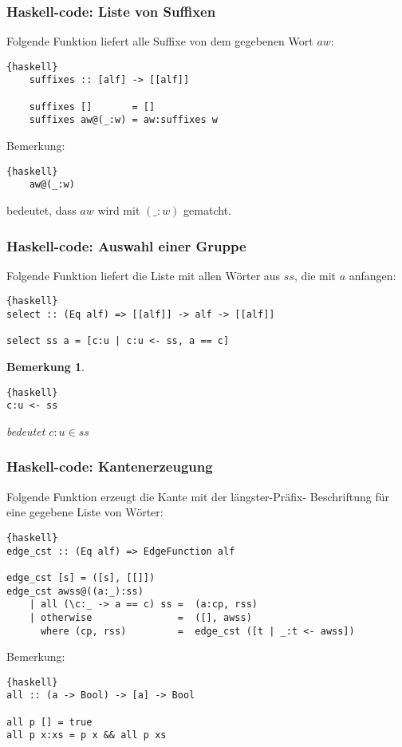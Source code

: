 \documentclass{beamer}
\newtheorem{remark}[theorem]{Bemerkung}
\begin{document}
\begin{frame}[fragile]
\frametitle{Haskell-code: Liste von Suffixen}
    Folgende Funktion liefert alle Suffixe von dem gegebenen Wort $aw$:
    \begin{lstlisting}{haskell}
    suffixes :: [alf] -> [[alf]]

    suffixes []       = []              
    suffixes aw@(_:w) = aw:suffixes w 
    \end{lstlisting}
    \bigskip
    Bemerkung: \begin{lstlisting}{haskell}
    aw@(_:w)
    \end{lstlisting} bedeutet, dass $aw$ wird mit $(\_:w)$ gematcht.
\end{frame}

\begin{frame}[fragile]
\frametitle{Haskell-code: Auswahl einer Gruppe}
    Folgende Funktion liefert die Liste mit allen Wörter aus $ss$, die mit $a$ anfangen:
\begin{lstlisting}{haskell}
select :: (Eq alf) => [[alf]] -> alf -> [[alf]]

select ss a = [c:u | c:u <- ss, a == c]
\end{lstlisting}
\bigskip
\begin{remark}
\begin{lstlisting}{haskell}
c:u <- ss
\end{lstlisting} bedeutet $c:u \in ss$
\end{remark}
\end{frame}

\begin{frame}[fragile]
\frametitle{Haskell-code: Kantenerzeugung}
Folgende Funktion erzeugt die Kante mit der längster-Präfix- Beschriftung für eine gegebene Liste von Wörter:
\begin{lstlisting}{haskell}
edge_cst :: (Eq alf) => EdgeFunction alf

edge_cst [s] = ([s], [[]])
edge_cst awss@((a:_):ss) 
    | all (\c:_ -> a == c) ss =  (a:cp, rss)
    | otherwise               =  ([], awss)
      where (cp, rss)         =  edge_cst ([t | _:t <- awss])
\end{lstlisting}
\bigskip
Bemerkung:
\begin{lstlisting}{haskell}
all :: (a -> Bool) -> [a] -> Bool

all p [] = true
all p x:xs = p x && all p xs
\end{lstlisting} 
\end{frame}
\end{document}
